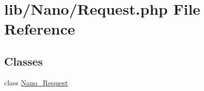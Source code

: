 \hypertarget{Request_8php}{
\section{lib/Nano/Request.php File Reference}
\label{Request_8php}
}
\subsection*{Classes}
\begin{CompactItemize}
\item 
class \hyperlink{classNano__Request}{Nano\_\-Request}
\end{CompactItemize}
